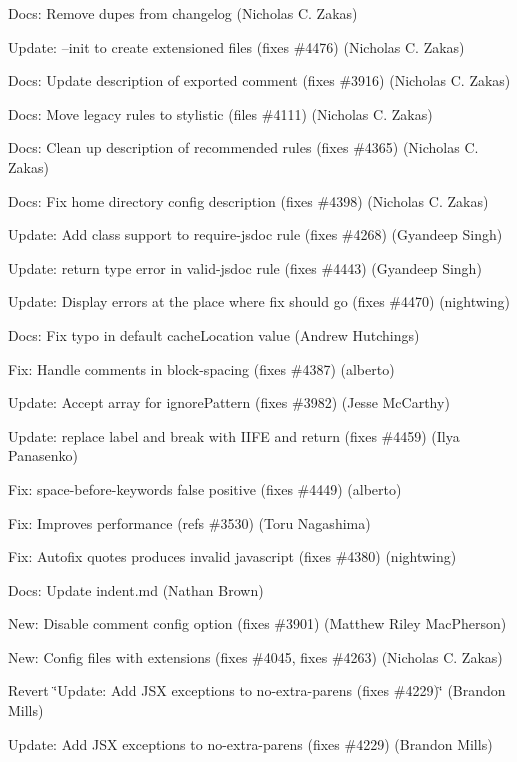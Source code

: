 \begin{DoxyItemize}
\item Docs\+: Remove dupes from changelog (Nicholas C. Zakas)
\item Update\+: --init to create extensioned files (fixes \#4476) (Nicholas C. Zakas)
\item Docs\+: Update description of exported comment (fixes \#3916) (Nicholas C. Zakas)
\item Docs\+: Move legacy rules to stylistic (files \#4111) (Nicholas C. Zakas)
\item Docs\+: Clean up description of recommended rules (fixes \#4365) (Nicholas C. Zakas)
\item Docs\+: Fix home directory config description (fixes \#4398) (Nicholas C. Zakas)
\item Update\+: Add class support to {\ttfamily require-\/jsdoc} rule (fixes \#4268) (Gyandeep Singh)
\item Update\+: return type error in {\ttfamily valid-\/jsdoc} rule (fixes \#4443) (Gyandeep Singh)
\item Update\+: Display errors at the place where fix should go (fixes \#4470) (nightwing)
\item Docs\+: Fix typo in default {\ttfamily cache\+Location} value (Andrew Hutchings)
\item Fix\+: Handle comments in block-\/spacing (fixes \#4387) (alberto)
\item Update\+: Accept array for {\ttfamily ignore\+Pattern} (fixes \#3982) (Jesse Mc\+Carthy)
\item Update\+: replace label and break with I\+I\+FE and return (fixes \#4459) (Ilya Panasenko)
\item Fix\+: space-\/before-\/keywords false positive (fixes \#4449) (alberto)
\item Fix\+: Improves performance (refs \#3530) (Toru Nagashima)
\item Fix\+: Autofix quotes produces invalid javascript (fixes \#4380) (nightwing)
\item Docs\+: Update indent.\+md (Nathan Brown)
\item New\+: Disable comment config option (fixes \#3901) (Matthew Riley Mac\+Pherson)
\item New\+: Config files with extensions (fixes \#4045, fixes \#4263) (Nicholas C. Zakas)
\item Revert \char`\"{}\+Update\+: Add J\+S\+X exceptions to no-\/extra-\/parens (fixes \#4229)\char`\"{} (Brandon Mills)
\item Update\+: Add J\+SX exceptions to no-\/extra-\/parens (fixes \#4229) (Brandon Mills)

\end{DoxyItemize}
